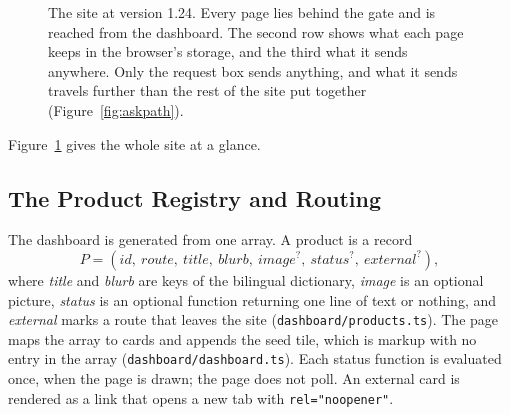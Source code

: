 \documentclass[sigconf,nonacm]{acmart}
\newcommand{\code}[1]{\textnormal{\texttt{\small #1}}}
\begin{document}
\begin{figure}[t]
  \caption{The site at version 1.24. Every page lies behind the gate and is reached from the
  dashboard. The second row shows what each page keeps in the browser's storage, and the third
  what it sends anywhere. Only the request box sends anything, and what it sends travels
  further than the rest of the site put together (Figure~\ref{fig:askpath}).}
  \label{fig:sitemap}
\end{figure}

Figure~\ref{fig:sitemap} gives the whole site at a glance.

\subsection{The Product Registry and Routing}\label{sec:registry}
The dashboard is generated from one array. A product is a record
\begin{equation}\label{eq:product}
  P = (\mathit{id},\ \mathit{route},\ \mathit{title},\ \mathit{blurb},\ \mathit{image}^{?},\
       \mathit{status}^{?},\ \mathit{external}^{?}),
\end{equation}
where \emph{title} and \emph{blurb} are keys of the bilingual dictionary, \emph{image} is an
optional picture, \emph{status} is an optional function returning one line of text or nothing,
and \emph{external} marks a route that leaves the site (\code{dashboard/products.ts}). The page
maps the array to cards and appends the seed tile, which is markup with no entry in the array
(\code{dashboard/dashboard.ts}). Each status function is evaluated once, when the page is
drawn; the page does not poll. An external card is rendered as a link that opens a new tab with
\code{rel="noopener"}.
\end{document}
